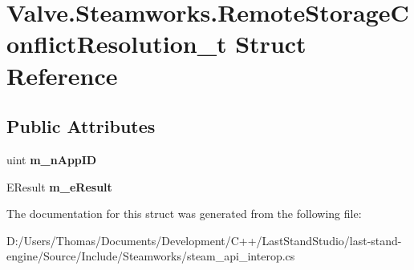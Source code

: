 \hypertarget{structValve_1_1Steamworks_1_1RemoteStorageConflictResolution__t}{}\section{Valve.\+Steamworks.\+Remote\+Storage\+Conflict\+Resolution\+\_\+t Struct Reference}
\label{structValve_1_1Steamworks_1_1RemoteStorageConflictResolution__t}
\subsection*{Public Attributes}
\begin{DoxyCompactItemize}
\item 
\hypertarget{structValve_1_1Steamworks_1_1RemoteStorageConflictResolution__t_a7f1dedbec3dceabbb34cd14c5555231f}{}uint {\bfseries m\+\_\+n\+App\+I\+D}\label{structValve_1_1Steamworks_1_1RemoteStorageConflictResolution__t_a7f1dedbec3dceabbb34cd14c5555231f}

\item 
\hypertarget{structValve_1_1Steamworks_1_1RemoteStorageConflictResolution__t_aa14018ac9396401cc43ab5ec607e457f}{}E\+Result {\bfseries m\+\_\+e\+Result}\label{structValve_1_1Steamworks_1_1RemoteStorageConflictResolution__t_aa14018ac9396401cc43ab5ec607e457f}

\end{DoxyCompactItemize}


The documentation for this struct was generated from the following file\+:\begin{DoxyCompactItemize}
\item 
D\+:/\+Users/\+Thomas/\+Documents/\+Development/\+C++/\+Last\+Stand\+Studio/last-\/stand-\/engine/\+Source/\+Include/\+Steamworks/steam\+\_\+api\+\_\+interop.\+cs\end{DoxyCompactItemize}
